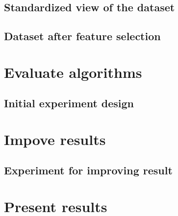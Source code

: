 \section{Standardized view of the dataset}
\section{Dataset after feature selection}

\chapter{Evaluate algorithms}
\section{Initial experiment design}

\chapter{Impove results}
\section{Experiment for improving result}

\chapter{Present results}